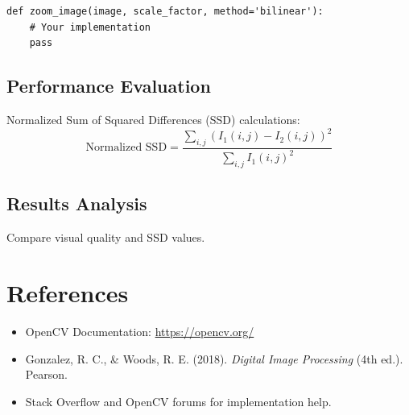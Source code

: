 \documentclass[11pt]{article}
\begin{document}
\begin{lstlisting}
def zoom_image(image, scale_factor, method='bilinear'):
    # Your implementation
    pass
\end{lstlisting}

\subsection{Performance Evaluation}
Normalized Sum of Squared Differences (SSD) calculations:
\[
\text{Normalized SSD} = \frac{\sum_{i,j}(I_1(i,j) - I_2(i,j))^2}{\sum_{i,j}I_1(i,j)^2}
\]

\subsection{Results Analysis}
Compare visual quality and SSD values.

\section{References}
\begin{itemize}
    \item OpenCV Documentation: \url{https://opencv.org/}
    \item Gonzalez, R. C., \& Woods, R. E. (2018). \textit{Digital Image Processing} (4th ed.). Pearson.
    \item Stack Overflow and OpenCV forums for implementation help.
\end{itemize}



% 
% 
\end{document}

